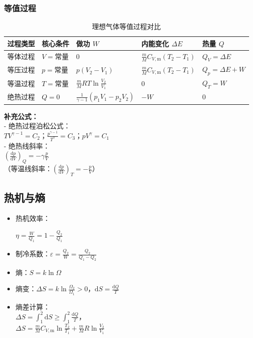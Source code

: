 \documentclass[12pt,a4paper,oneside]{article}
\numberwithin{equation}{section}
\newcommand{\keyformula}[1]{%
    \needspace{2\baselineskip}%
    \begin{tcolorbox}[
        colback=highlight,colframe=white,boxrule=0pt,arc=0pt,
        left=6pt,right=6pt,top=4pt,bottom=4pt,center upper,
        boxsep=0pt
    ]
    $\displaystyle #1$
    \end{tcolorbox}%
    \vspace{0.2em}
}
\begin{document}
\subsubsection{等值过程}
\begin{table}[htbp]
    \centering
    \scriptsize
    \begin{tabular}{@{}p{1.2cm}|p{1.4cm}|p{2.6cm}|p{2.6cm}|p{2.6cm}@{}}
        \toprule
        \rowcolor{tablehead} 过程类型 & 核心条件 & 做功 $W$ & 内能变化 $\Delta E$ & 热量 $Q$ \\
        \midrule
        等体过程 & $V=$常量 & $0$ & $\frac{m}{M}C_{V,\text{m}}(T_2-T_1)$ & $Q_V = \Delta E$ \\
        \midrule
        等压过程 & $p=$常量 & $p(V_2-V_1)$ & $\frac{m}{M}C_{V,\text{m}}(T_2-T_1)$ & $Q_p = \Delta E + W$ \\
        \midrule
        等温过程 & $T=$常量 & $\frac{m}{M}RT\ln\frac{V_2}{V_1}$ & $0$ & $Q_T = W$ \\
        \midrule
        绝热过程 & $Q=0$ & $\frac{1}{\gamma-1}(p_1V_1-p_2V_2)$ & $-W$ & $0$ \\
        \bottomrule
    \end{tabular}
    \caption{理想气体等值过程对比}
    \label{tab:thermo_process}
    \vspace{-0.5em}
\end{table}

\textbf{补充公式：}\\
- 绝热过程泊松公式：\\
  $TV^{\gamma-1}=C_2$；$\frac{p^{\gamma-1}}{T^\gamma}=C_3$；$pV^\gamma=C_1$\\
- 绝热线斜率：\\
  $\left( \frac{\mathrm{d}p}{\mathrm{d}V} \right)_Q = -\gamma \frac{p}{V}$ \\
  （等温线斜率：$\left( \frac{\mathrm{d}p}{\mathrm{d}V} \right)_T = -\frac{p}{V}$）

\subsection{热机与熵}
\begin{itemize}
    \item 热机效率：\keyformula{\eta = \frac{W}{Q_1} = 1 - \frac{Q_2}{Q_1}}
    \item 制冷系数：$\varepsilon = \frac{Q_2}{W} = \frac{Q_2}{Q_1 - Q_2}$
    \item 熵：$S = k\ln \Omega$
    \item 熵变：$\Delta S = k\ln \frac{\Omega_2}{\Omega_1} > 0$，$\mathrm{d}S = \frac{\mathrm{d}Q}{T}$
    \item 熵差计算：\\
      $\Delta S = \int_{1}^{2} \mathrm{d}S \geqslant \int_{1}^{2} \frac{\mathrm{d}Q}{T}$，\\
      $\Delta S = \frac{m}{M} C_{V,\text{m}} \ln\frac{T_2}{T_1} + \frac{m}{M} R \ln\frac{V_2}{V_1}$
\end{itemize}
\end{document}
